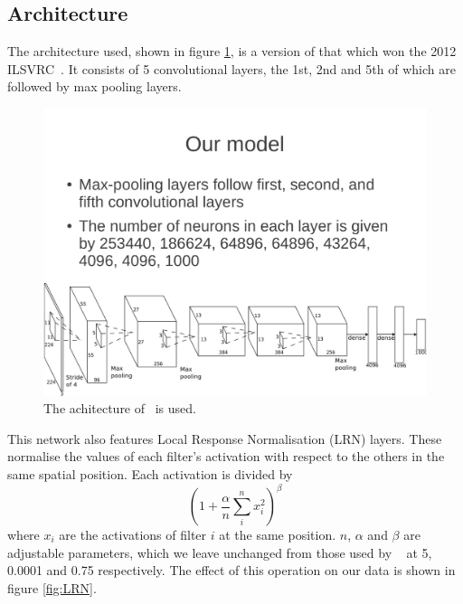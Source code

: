 \documentclass[11pt]{article} %
\begin{document}
\subsection{Architecture}



\label{sec:alexNet}

The architecture used, shown in figure \ref{fig:alexNet}, is a version of that which won the 2012 ILSVRC~\cite{Krizhevsky2012}. It consists of 5 convolutional layers, the 1st, 2nd and 5th of which are followed by max pooling layers. 

\begin{figure}
\centering
\includegraphics*[width=\linewidth,trim={0cm 0cm 0.78cm 12cm},clip]{alexNet} 
\caption{ The achitecture of~\cite{Krizhevsky2012} is used.\label{fig:alexNet}}
\end{figure}



This network also features Local Response Normalisation (LRN) layers. These normalise the values of each filter's activation with respect to the others in the same spatial position. Each activation is divided by
\begin{equation}
(1 + \frac{\alpha}{n} \sum_i^n x_i^2)^\beta
\end{equation}
where $x_i$ are the activations of filter $i$ at the same position. $n$, $\alpha$ and $\beta$ are adjustable parameters, which we leave unchanged from those used by ~\cite{Krizhevsky2012} at 5, 0.0001 and 0.75 respectively. The effect of this operation on our data is shown in figure \ref{fig:LRN}. 
\end{document}
